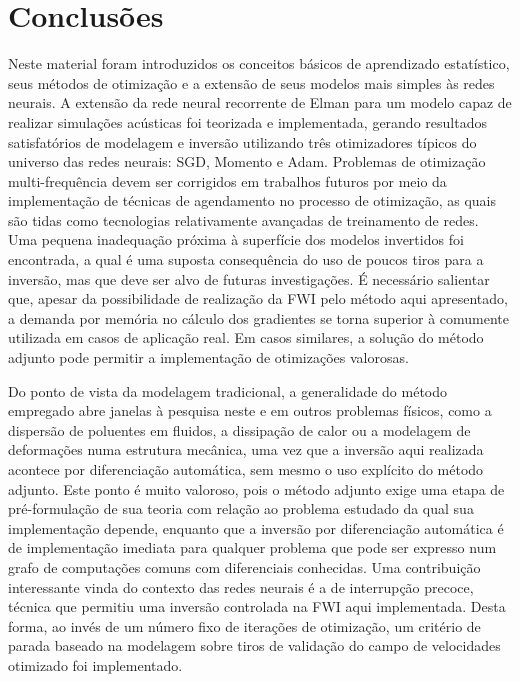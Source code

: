 
\chapter{Conclusões}

  Neste material foram introduzidos os conceitos básicos de aprendizado estatístico, seus métodos de otimização e a extensão de seus modelos mais simples às redes neurais. A extensão da rede neural recorrente de Elman para um modelo capaz de realizar simulações acústicas foi teorizada e implementada, gerando resultados satisfatórios de modelagem e inversão utilizando três otimizadores típicos do universo das redes neurais: SGD, Momento e Adam. Problemas de otimização multi-frequência devem ser corrigidos em trabalhos futuros por meio da implementação de técnicas de agendamento no processo de otimização, as quais são tidas como tecnologias relativamente avançadas de treinamento de redes. Uma pequena inadequação próxima à superfície dos modelos invertidos foi encontrada, a qual é uma suposta consequência do uso de poucos tiros para a inversão, mas que deve ser alvo de futuras investigações. É necessário salientar que, apesar da possibilidade de realização da FWI pelo método aqui apresentado, a demanda por memória no cálculo dos gradientes se torna superior à comumente utilizada em casos de aplicação real. Em casos similares, a solução do método adjunto pode permitir a implementação de otimizações valorosas.

  Do ponto de vista da modelagem tradicional, a generalidade do método empregado abre janelas à pesquisa neste e em outros problemas físicos, como a dispersão de poluentes em fluidos, a dissipação de calor ou a modelagem de deformações numa estrutura mecânica, uma vez que a inversão aqui realizada acontece por diferenciação automática, sem mesmo o uso explícito do método adjunto. Este ponto é muito valoroso, pois o método adjunto exige uma etapa de pré-formulação de sua teoria com relação ao problema estudado da qual sua implementação depende, enquanto que a inversão por diferenciação automática é de implementação imediata para qualquer problema que pode ser expresso num grafo de computações comuns com diferenciais conhecidas. Uma contribuição interessante vinda do contexto das redes neurais é a de interrupção precoce, técnica que permitiu uma inversão controlada na FWI aqui implementada. Desta forma, ao invés de um número fixo de iterações de otimização, um critério de parada baseado na modelagem sobre tiros de validação do campo de velocidades otimizado foi implementado.

